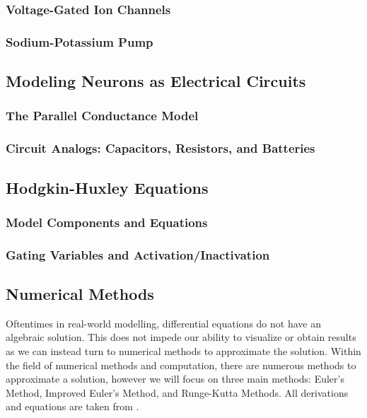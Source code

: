 \documentclass{article} %
\begin{document}
\begin{multicols}{2}
\subsubsection{Voltage-Gated Ion Channels}
\label{subsubsec:vgic}
\subsubsection{Sodium-Potassium Pump}
\label{subsubsec:na_k_pump}

\subsection{Modeling Neurons as Electrical Circuits}
\label{subsec:circuit_model}
\subsubsection{The Parallel Conductance Model}
\label{subsubsec:parallel_conductance}
\subsubsection{Circuit Analogs: Capacitors, Resistors, and Batteries}
\label{subsubsec:circuit_analogs}

\subsection{Hodgkin-Huxley Equations}
\label{subsec:hodgekin_huxley}
\subsubsection{Model Components and Equations}
\label{subsubsec:hh_equations}
\subsubsection{Gating Variables and Activation/Inactivation}
\label{subsubsec:gating_variables}

\subsection{Numerical Methods}
\label{subsec:numerical_methods}

Oftentimes in real-world modelling, differential equations do not have an algebraic solution.
This does not impede our ability to visualize or obtain results as we can instead turn to numerical methods to approximate the solution.
Within the field of numerical methods and computation, there are numerous methods to approximate a solution, however we will focus on three main methods: Euler's Method, Improved Euler's Method, and Runge-Kutta Methods.
All derivations and equations are taken from \cite{brannan2015differential}.


\end{multicols}
\end{document}
